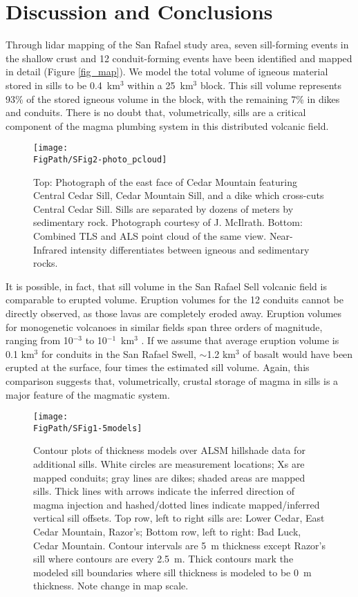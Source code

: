 \section{Discussion and Conclusions}

Through lidar mapping of the San Rafael study area, seven sill-forming events in the shallow crust and 12 conduit-forming events have been identified and mapped in detail (Figure \ref{fig_map}). We model the total volume of igneous material stored in sills to be 0.4~km$^3$ within a 25~km$^3$ block. This sill volume represents 93\% of the stored igneous volume in the block, with the remaining 7\% in dikes and conduits. There is no doubt that, volumetrically, sills are a critical component of the magma plumbing system in this distributed volcanic field.

\begin{figure}
\centering
\texttt{[image: \\FigPath/SFig2-photo\_pcloud]}
\caption[Photograph and lidar point cloud of the east face of Cedar Mountain]{Top: Photograph of the east face of Cedar Mountain featuring Central Cedar Sill, Cedar Mountain Sill, and a dike which cross-cuts Central Cedar Sill. Sills are separated by dozens of meters by sedimentary rock. Photograph courtesy of J. McIlrath. Bottom: Combined TLS and ALS point cloud of the same view. Near-Infrared intensity differentiates between igneous and sedimentary rocks.}
\label{fig_photo-pcloud}
\end{figure}

It is possible, in fact, that sill volume in the San Rafael Sell volcanic field is comparable to erupted volume. Eruption volumes for the 12 conduits cannot be directly observed, as those lavas are completely eroded away. Eruption volumes for monogenetic volcanoes in similar fields span three orders of magnitude, ranging from 10$^{-3}$ to 10$^{-1}$~km$^3$ \citep[e.g.]{crowe1983aspects, condit1989patterns, kiyosugi2012relationship}. If we assume that average eruption volume is 0.1 km$^3$ for conduits in the San Rafael Swell, $\sim$1.2 km$^3$ of basalt would have been erupted at the surface, four times the estimated sill volume. Again, this comparison suggests that, volumetrically, crustal storage of magma in sills is a major feature of the magmatic system.


\begin{figure}[h!]
\centering
\texttt{[image: \\FigPath/SFig1-5models]}
\caption[Contour plots of thickness models over ALSM hillshade data for additional sills]{Contour plots of thickness models over ALSM hillshade data for additional sills. White circles are measurement locations; Xs are mapped conduits; gray lines are dikes; shaded areas are mapped sills. Thick lines with arrows indicate the inferred direction of magma injection and hashed/dotted lines indicate mapped/inferred vertical sill offsets. Top row, left to right sills are: Lower Cedar, East Cedar Mountain, Razor's; Bottom row, left to right: Bad Luck, Cedar Mountain. Contour intervals are 5~m thickness except Razor’s sill where contours are every 2.5~m. Thick contours mark the modeled sill boundaries where sill thickness is modeled to be 0~m thickness. Note change in map scale. }
\label{fig_fivemodels}
\end{figure}

